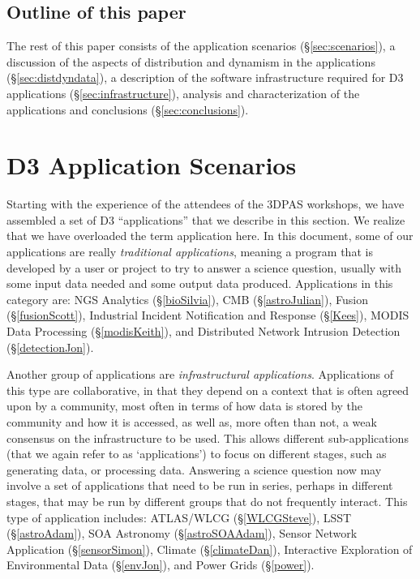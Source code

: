 \subsection{Outline of this paper}

The rest of this paper consists of
the application scenarios (\S\ref{sec:scenarios}),
a discussion of the aspects of distribution and dynamism in the
applications (\S\ref{sec:distdyndata}),
a description of the software infrastructure required for D3 applications
(\S\ref{sec:infrastructure}),
analysis and characterization of the applications and
conclusions (\S\ref{sec:conclusions}).

\section{D3 Application Scenarios \label{sec:scenarios}}

Starting with the experience of the attendees of the 3DPAS workshops,
we have assembled a set of D3 ``applications'' that we describe in
this section.  We realize that we have overloaded the term application
here.  In this document, some of our applications are really {\em
  traditional applications}, meaning a program that is developed by a
user or project to try to answer a science question, usually with some
input data needed and some output data produced.  Applications in this
category are: NGS Analytics (\S\ref{bioSilvia}), CMB
(\S\ref{astroJulian}), Fusion (\S\ref{fusionScott}), Industrial
Incident Notification and Response (\S\ref{Kees}), MODIS Data
Processing (\S\ref{modisKeith}), and Distributed Network Intrusion
Detection (\S\ref{detectionJon}).

Another group of applications are {\em infrastructural applications}.
Applications of this type are collaborative, in that they depend on a
context that is often agreed upon by a community, most often in terms
of how data is stored by the community and how it is accessed, as well
as, more often than not, a weak consensus on the infrastructure to be
used. %
This allows different
sub-applications (that we again refer to as `applications') to focus
on different stages, such as generating data, or processing data.
Answering a science question now may involve a set of applications
that need to be run in series, perhaps in different stages, that may
be run by different groups that do not frequently interact.  This type
of application includes: ATLAS/WLCG (\S\ref{WLCGSteve}), LSST
(\S\ref{astroAdam}), SOA Astronomy (\S\ref{astroSOAAdam}), Sensor
Network Application (\S\ref{sensorSimon}), Climate
(\S\ref{climateDan}), Interactive Exploration of Environmental Data
(\S\ref{envJon}), and Power Grids (\S\ref{power}).

